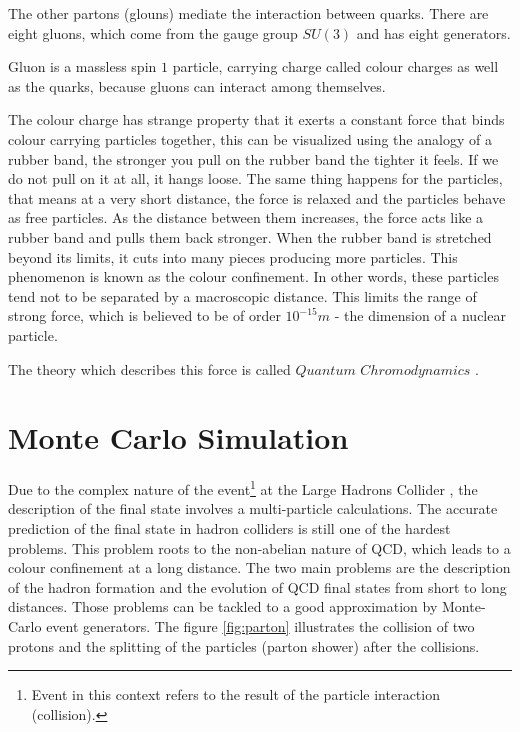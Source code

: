 The other partons (glouns)  mediate the interaction between quarks. 
There are eight gluons, which come from the gauge group $SU(3)$ and has eight generators.

Gluon is a massless spin $1$ particle, carrying charge called colour charges as well as the quarks, because gluons can interact among themselves.

The colour charge has strange property that it exerts a constant force that binds colour carrying particles together, this can be visualized using the analogy of a rubber band, the stronger you pull on the rubber band the tighter it feels.
If we do not pull on it at all, it hangs loose. The same thing happens for the particles,  that means at a very short distance, the force is relaxed and the particles behave as free particles. As the distance between them increases, the force acts like a rubber band and pulls them back stronger. When the rubber band is stretched beyond its limits, it cuts into many pieces producing more particles. This phenomenon is known as the colour confinement. In other words, these particles tend not to be separated by a macroscopic distance.
This limits the range of strong force, which is believed to be of order $10^{-15}\si{m}$ -
the dimension of a nuclear particle.

The theory which describes this force is called $Quantum$ $Chromodynamics$ \citep{particle}.

\section{Monte Carlo Simulation}

Due to the complex nature of the event\footnote{Event in this context refers to the result of the particle interaction (collision).} at the Large Hadrons Collider , the description of the final state involves a multi-particle calculations. The accurate prediction of the final state in hadron colliders is still one of the hardest problems. This problem roots to the non-abelian nature of QCD, which leads to a colour confinement at a long distance. The two main problems are the description of the hadron formation and the evolution of QCD final states from short to long distances. Those problems can be tackled to a good approximation by Monte-Carlo event generators.
The figure \ref{fig:parton} illustrates the collision of two protons and the splitting of the particles (parton shower) after the collisions.   

